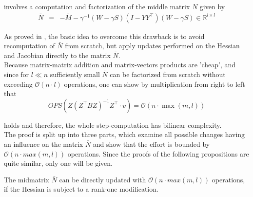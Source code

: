 \documentclass{svmult}
\begin{document}
\noindent involves a computation and factorization of the middle matrix $N$ given by
\begin{eqnarray*}
	\bar{N}&=&-\bar{M}-\gamma^{-1} (W-\gamma S) (I-YY^{\top}) (W-\gamma S) \in \mathbb{R}^{l \times l}
\end{eqnarray*}

\noindent As proved in \cite{tb:TORSTEN}, the basic idea to overcome this drawback is to avoid recomputation of $\bar{N}$ from scratch, but apply updates performed on the Hessian and Jacobian directly to the matrix $\bar{N}$.\\
Because matrix-matrix addition and matrix-vectors products are 'cheap', and since for $l \ll n$ sufficiently small $\bar{N}$ can be factorized from scratch without exceeding $\mathcal{O}(n\cdot l)$ operations, one can show by multiplication from right to left that 
\begin{equation*}
	OPS(Z(Z^{\top}BZ)^{-1}Z^{\top}\cdot v)=\mathcal{O}(n \cdot \max(m,l)) 
\end{equation*}

\noindent holds and therefore, the whole step-computation has bilinear complexity.\\ 
\noindent The proof is split up into three parts, which examine all possible changes having an influence on the matrix $\bar{N}$ and show that the effort is bounded by $\mathcal{O}(n\cdot max(m,l))$ operations.
Since the proofs of the following propositions are quite similar, only one will be given.

\begin{proposition}
	The midmatrix $\bar{N}$ can be directly updated with $\mathcal{O}(n\cdot max(m,l))$ operations, if the Hessian is subject to a rank-one modification.
\end{proposition}
\end{document}
